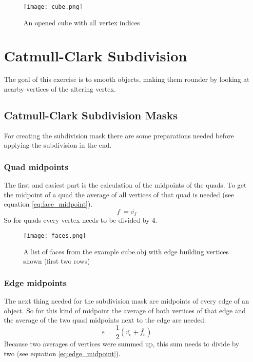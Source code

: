 \documentclass[11.5pt,oneside,a4paper]{scrartcl}
\newcounter{ct}
\begin{document}
\begin{wrapfigure}{R}{0.45\textwidth}
	\centering
	\texttt{[image: cube.png]}
	\caption{An opened cube with all vertex indices}
	\label{fig:cube}
\end{wrapfigure}

\section{Catmull-Clark Subdivision}
The goal of this exercise is to smooth objects, making them rounder by looking at nearby vertices of the altering vertex.

\subsection{Catmull-Clark Subdivision Masks}
For creating the subdivision mask there are some preparations needed before applying the subdivision in the end.

\subsubsection{Quad midpoints}
The first and easiest part is the calculation of the midpoints of the quads. To get the midpoint of a quad the average of all vertices of that quad is needed (see equation \ref{eq:face_midpoint}).
\begin{equation} \label{eq:face_midpoint}
        f \ = \overline{v_{f}}
\end{equation} 
So for quads every vertex needs to be divided by 4.

\begin{wrapfigure}{R}{0.45\textwidth}
	\centering
	\texttt{[image: faces.png]}
	\caption{A list of faces from the example cube.obj with edge building vertices shown (first two rows)}
	\label{fig:faces}
\end{wrapfigure}

\subsubsection{Edge midpoints}
The next thing needed for the subdivision mask are midpoints of every edge of an object. So for this kind of midpoint the average of both vertices of that edge and the average of the two quad midpoints next to the edge are needed.
\begin{equation} \label{eq:edge_midpoint}
        e \ = \frac{1}{2} ( \overline{v_{e}} + \overline{f_{e}} )
\end{equation} 
Because two averages of vertices were summed up, this sum needs to divide by two (see equation \ref{eq:edge_midpoint}).
\end{document}

